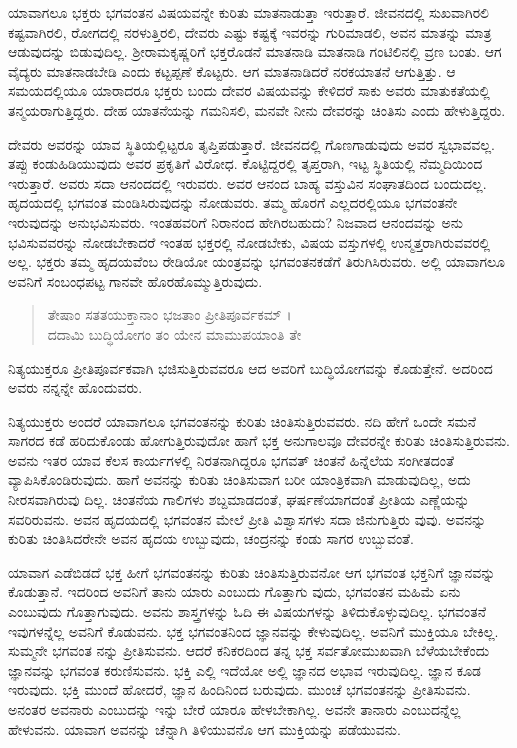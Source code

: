 ಯಾವಾಗಲೂ ಭಕ್ತರು ಭಗವಂತನ ವಿಷಯವನ್ನೇ ಕುರಿತು ಮಾತನಾಡುತ್ತಾ ಇರುತ್ತಾರೆ. ಜೀವನದಲ್ಲಿ ಸುಖವಾಗಿರಲಿ ಕಷ್ಟವಾಗಿರಲಿ, ರೋಗದಲ್ಲಿ ನರಳುತ್ತಿರಲಿ, ದೇವರು ಎಷ್ಟು ಕಷ್ಟಕ್ಕೆ ಇವರನ್ನು ಗುರಿಮಾಡಲಿ, ಅವನ ಮಾತನ್ನು ಮಾತ್ರ ಆಡುವುದನ್ನು ಬಿಡುವುದಿಲ್ಲ. ಶ್ರೀರಾಮಕೃಷ್ಣರಿಗೆ ಭಕ್ತರೊಡನೆ ಮಾತನಾಡಿ ಮಾತನಾಡಿ ಗಂಟಿಲಿನಲ್ಲಿ ವ್ರಣ  ಬಂತು. ಆಗ ವೈದ್ಯರು ಮಾತನಾಡಬೇಡಿ ಎಂದು ಕಟ್ಟಪ್ಪಣೆ ಕೊಟ್ಟರು. ಆಗ ಮಾತನಾಡಿದರೆ ನರಕಯಾತನೆ ಆಗುತ್ತಿತ್ತು. ಆ ಸಮಯದಲ್ಲಿಯೂ ಯಾರಾದರೂ ಭಕ್ತರು ಬಂದು ದೇವರ ವಿಷಯವನ್ನು ಕೇಳಿದರೆ ಸಾಕು ಅವರು ಮಾತುಕತೆಯಲ್ಲಿ ತನ್ಮಯರಾಗುತ್ತಿದ್ದರು. ದೇಹ ಯಾತನೆಯನ್ನು ಗಮನಿಸಲಿ, ಮನವೇ ನೀನು ದೇವರನ್ನು ಚಿಂತಿಸು ಎಂದು ಹೇಳುತ್ತಿದ್ದರು.

ದೇವರು ಅವರನ್ನು ಯಾವ ಸ್ಥಿತಿಯಲ್ಲಿಟ್ಟರೂ ತೃಪ್ತಿಪಡುತ್ತಾರೆ. ಜೀವನದಲ್ಲಿ ಗೊಣಗಾಡುವುದು ಅವರ ಸ್ವಭಾವವಲ್ಲ. ತಪ್ಪು ಕಂಡುಹಿಡಿಯುವುದು ಅವರ ಪ್ರಕೃತಿಗೆ ವಿರೋಧ. ಕೊಟ್ಟಿದ್ದರಲ್ಲಿ ತೃಪ್ತರಾಗಿ, ಇಟ್ಟ ಸ್ಥಿತಿಯಲ್ಲಿ ನೆಮ್ಮದಿಯಿಂದ ಇರುತ್ತಾರೆ. ಅವರು ಸದಾ ಆನಂದದಲ್ಲಿ ಇರುವರು. ಅವರ ಆನಂದ ಬಾಹ್ಯ ವಸ್ತುವಿನ ಸಂಘಾತದಿಂದ ಬಂದುದಲ್ಲ. ಹೃದಯದಲ್ಲಿ ಭಗವಂತ ಮಂಡಿಸಿರುವುದನ್ನು ನೋಡುವರು. ತಮ್ಮ ಹೊರಗೆ ಎಲ್ಲದರಲ್ಲಿಯೂ ಭಗವಂತನೇ ಇರುವುದನ್ನು ಅನುಭವಿಸುವರು. ಇಂತಹವರಿಗೆ ನಿರಾನಂದ ಹೇಗಿರಬಹುದು? ನಿಜವಾದ ಆನಂದವನ್ನು ಅನು ಭವಿಸುವವರನ್ನು ನೋಡಬೇಕಾದರೆ ಇಂತಹ ಭಕ್ತರಲ್ಲಿ ನೋಡಬೇಕು, ವಿಷಯ ವಸ್ತುಗಳಲ್ಲಿ ಉನ್ಮತ್ತರಾಗಿರುವವರಲ್ಲಿ ಅಲ್ಲ. ಭಕ್ತರು ತಮ್ಮ ಹೃದಯವೆಂಬ ರೇಡಿಯೋ ಯಂತ್ರವನ್ನು ಭಗವಂತನಕಡೆಗೆ ತಿರುಗಿಸಿರುವರು. ಅಲ್ಲಿ ಯಾವಾಗಲೂ ಅವನಿಗೆ ಸಂಬಂಧಪಟ್ಟ ಗಾನವೇ ಹೊರಹೊಮ್ಮುತ್ತಿರುವುದು.

\begin{verse}
ತೇಷಾಂ ಸತತಯುಕ್ತಾನಾಂ ಭಜತಾಂ ಪ್ರೀತಿಪೂರ್ವಕಮ್ ।\\ದದಾಮಿ ಬುದ್ಧಿಯೋಗಂ ತಂ ಯೇನ ಮಾಮುಪಯಾಂತಿ ತೇ 
\end{verse}

{\small ನಿತ್ಯಯುಕ್ತರೂ ಪ್ರೀತಿಪೂರ್ವಕವಾಗಿ ಭಜಿಸುತ್ತಿರುವವರೂ ಆದ ಅವರಿಗೆ ಬುದ್ಧಿಯೋಗವನ್ನು ಕೊಡುತ್ತೇನೆ. ಅದರಿಂದ ಅವರು ನನ್ನನ್ನೇ ಹೊಂದುವರು.}

ನಿತ್ಯಯುಕ್ತರು ಅಂದರೆ ಯಾವಾಗಲೂ ಭಗವಂತನನ್ನು ಕುರಿತು ಚಿಂತಿಸುತ್ತಿರುವವರು. ನದಿ ಹೇಗೆ ಒಂದೇ ಸಮನೆ ಸಾಗರದ ಕಡೆ ಹರಿದುಕೊಂಡು ಹೋಗುತ್ತಿರುವುದೋ ಹಾಗೆ ಭಕ್ತ ಅನುಗಾಲವೂ ದೇವರನ್ನೇ ಕುರಿತು ಚಿಂತಿಸುತ್ತಿರುವನು. ಅವನು ಇತರ ಯಾವ ಕೆಲಸ ಕಾರ್ಯಗಳಲ್ಲಿ ನಿರತನಾಗಿದ್ದರೂ ಭಗವತ್ ಚಿಂತನೆ ಹಿನ್ನೆಲೆಯ ಸಂಗೀತದಂತೆ ವ್ಯಾಪಿಸಿಕೊಂಡಿರುವುದು. ಹಾಗೆ ಅವನನ್ನು ಕುರಿತು ಚಿಂತಿಸುವಾಗ ಬರೀ ಯಾಂತ್ರಿಕವಾಗಿ ಮಾಡುವುದಿಲ್ಲ, ಅದು ನೀರಸವಾಗಿರುವು ದಿಲ್ಲ. ಚಿಂತನೆಯ ಗಾಲಿಗಳು ಶಬ್ದಮಾಡದಂತೆ, ಘರ್ಷಣೆಯಾಗದಂತೆ ಪ್ರೀತಿಯ ಎಣ್ಣೆಯನ್ನು ಸವರಿರುವನು. ಅವನ ಹೃದಯದಲ್ಲಿ ಭಗವಂತನ ಮೇಲೆ ಪ್ರೀತಿ ವಿಶ್ವಾಸಗಳು ಸದಾ ಜಿನುಗುತ್ತಿರು ವುವು. ಅವನನ್ನು ಕುರಿತು ಚಿಂತಿಸಿದರೇನೇ ಅವನ ಹೃದಯ ಉಬ್ಬುವುದು, ಚಂದ್ರನನ್ನು ಕಂಡು ಸಾಗರ ಉಬ್ಬುವಂತೆ.

ಯಾವಾಗ ಎಡೆಬಿಡದೆ ಭಕ್ತ ಹೀಗೆ ಭಗವಂತನನ್ನು ಕುರಿತು ಚಿಂತಿಸುತ್ತಿರುವನೋ ಆಗ ಭಗವಂತ ಭಕ್ತನಿಗೆ ಜ್ಞಾನವನ್ನು ಕೊಡುತ್ತಾನೆ. ಇದರಿಂದ ಅವನಿಗೆ ತಾನು ಯಾರು ಎಂಬುದು ಗೊತ್ತಾಗು ವುದು, ಭಗವಂತನ ಮಹಿಮೆ ಏನು ಎಂಬುವುದು ಗೊತ್ತಾಗುವುದು. ಅವನು ಶಾಸ್ತ್ರಗಳನ್ನು ಓದಿ ಈ ವಿಷಯಗಳನ್ನು ತಿಳಿದುಕೊಳ್ಳುವುದಿಲ್ಲ. ಭಗವಂತನೆ ಇವುಗಳನ್ನೆಲ್ಲ ಅವನಿಗೆ ಕೊಡುವನು. ಭಕ್ತ ಭಗವಂತನಿಂದ ಜ್ಞಾನವನ್ನು ಕೇಳುವುದಿಲ್ಲ. ಅವನಿಗೆ ಮುಕ್ತಿಯೂ ಬೇಕಿಲ್ಲ. ಸುಮ್ಮನೇ ಭಗವಂತ ನನ್ನು ಪ್ರೀತಿಸುವನು. ಆದರೆ ಕನಿಕರದಿಂದ ತನ್ನ ಭಕ್ತ ಸರ್ವತೋಮುಖವಾಗಿ ಬೆಳೆಯಬೇಕೆಂದು ಜ್ಞಾನವನ್ನು ಭಗವಂತ ಕರುಣಿಸುವನು. ಭಕ್ತಿ ಎಲ್ಲಿ ಇದೆಯೋ ಅಲ್ಲಿ ಜ್ಞಾನದ ಅಭಾವ ಇರುವುದಿಲ್ಲ. ಜ್ಞಾನ ಕೂಡ ಇರುವುದು. ಭಕ್ತಿ ಮುಂದೆ ಹೋದರೆ, ಜ್ಞಾನ ಹಿಂದಿನಿಂದ ಬರುವುದು. ಮುಂಚೆ ಭಗವಂತನನ್ನು ಪ್ರೀತಿಸುವನು. ಅನಂತರ ಅವನಾರು ಎಂಬುದನ್ನು ಇನ್ನು ಬೇರೆ ಯಾರೂ ಹೇಳಬೇಕಾಗಿಲ್ಲ. ಅವನೇ ತಾನಾರು ಎಂಬುದನ್ನೆಲ್ಲ ಹೇಳುವನು. ಯಾವಾಗ ಅವನನ್ನು ಚೆನ್ನಾಗಿ ತಿಳಿಯುವನೊ ಆಗ ಮುಕ್ತಿಯನ್ನು ಪಡೆಯುವನು.

